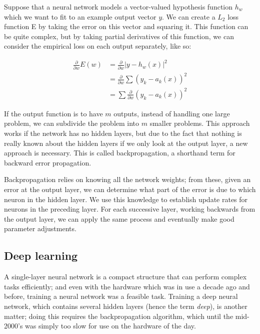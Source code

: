 Suppose that a neural network models a vector-valued hypothesis
function $h_w$ which we want to fit to an example output vector
$y$. We can create a $L_2$ loss function E by taking the error on this
vector and squaring it. This function can be quite complex, but by
taking partial derivatives of this function, we can consider the
empirical loss on each output separately, like so:

\begin{equation}
  \begin{aligned} 
    \frac{\partial}{\partial w} E(w) &= \frac{\partial}{\partial w} \lvert y - h_w(x) \rvert^2 \\
    &= \frac{\partial}{\partial w} \sum (y_k - a_k(x))^2 \\
    &=  \sum \frac{\partial}{\partial w} (y_k - a_k(x))^2
  \end{aligned} 
\end{equation}

If the output function is to have $m$ outputs, instead of handling one
large problem, we can subdivide the problem into $m$ smaller
problems. This approach works if the network has no hidden layers, but
due to the fact that nothing is really known about the hidden layers
if we only look at the output layer, a new approach is necessary. This
is called backpropagation, a shorthand term for backward error
propagation.

Backpropagation relies on knowing all the network weights; from these,
given an error at the output layer, we can determine what part of the
error is due to which neuron in the hidden layer. We use this
knowledge to establish update rates for neurons in the preceding
layer. For each successive layer, working backwards from the output
layer, we can apply the same process and eventually make good
parameter adjustments.


\subsection{Deep learning}
\label{sec:deeplearning}

A single-layer neural network is a compact structure that can perform
complex tasks efficiently; and even with the hardware which was in use
a decade ago and before, training a neural network was a feasible
task. Training a deep neural network, which contains several hidden
layers (hence the term \textit{deep}), is another matter; doing this
requires the backpropagation algorithm, which until the mid-2000's was
simply too slow for use on the hardware of the day.

